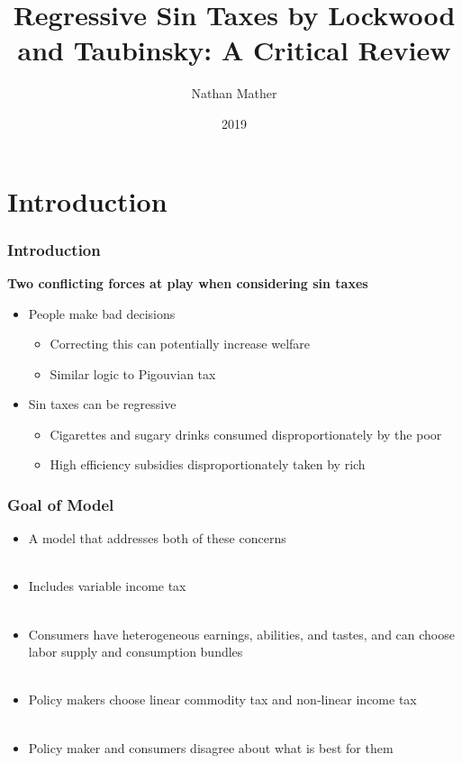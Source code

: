 \documentclass{beamer}
\title{Regressive Sin Taxes by Lockwood and Taubinsky: A Critical Review}
\author{Nathan Mather}
\institute{University of Michigan}
\date{2019}
\begin{document}
	
	
	
	\frame{\titlepage}
	
\section{Introduction}
	
	\begin{frame}
	\frametitle{Introduction}

\textbf{Two conflicting forces at play when considering sin taxes }
\begin{itemize}
	\item People make bad decisions
	\begin{itemize}
		\item Correcting this can potentially increase welfare
		\item Similar logic to Pigouvian tax
	\end{itemize}
	\item Sin taxes can be regressive 
	\begin{itemize}
		\item Cigarettes and sugary drinks consumed disproportionately by the poor
		\item High efficiency subsidies disproportionately taken by rich
	\end{itemize}
\end{itemize}


\end{frame}


	\begin{frame}
\frametitle{Goal of Model}

\begin{itemize}

\item A model that addresses both of these concerns  \\~\\

\item Includes variable income tax \\~\\

\item Consumers have heterogeneous earnings, abilities, and tastes, and can choose labor supply and consumption bundles\\~\\

\item Policy makers choose linear commodity tax and non-linear income tax \\~\\

\item Policy maker and consumers disagree about what is best for them

	
\end{itemize} 
\end{frame}
\end{document}
